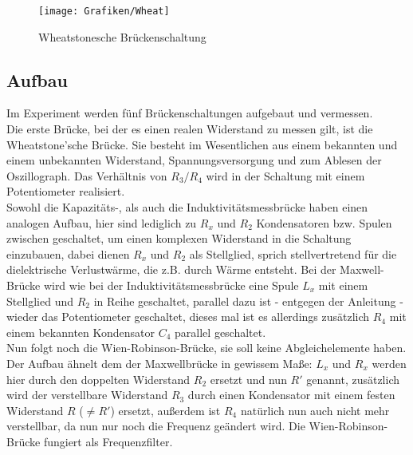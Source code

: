 \begin{wrapfigure}[14]{r}{0.4\textwidth}
       \texttt{[image: Grafiken/Wheat]}
       \caption{Wheatstonesche Brückenschaltung}
       \label{fig:Wheat}
\end{wrapfigure}
\subsection{Aufbau}
Im Experiment werden fünf Brückenschaltungen aufgebaut und vermessen. \\
Die erste Brücke, bei der es einen realen Widerstand zu messen gilt, ist die Wheatstone'sche Brücke. Sie besteht im Wesentlichen aus einem bekannten und einem unbekannten Widerstand, Spannungsversorgung und zum Ablesen der Oszillograph. Das Verhältnis von $R_3/R_4$ wird in der Schaltung mit einem Potentiometer realisiert.\\
Sowohl die Kapazitäts-, als auch die Induktivitätsmessbrücke haben einen analogen Aufbau, hier sind lediglich zu $R_x$ und $R_2$ Kondensatoren bzw. Spulen zwischen geschaltet, um einen komplexen Widerstand in die Schaltung einzubauen, dabei dienen $R_x$ und $R_2$ als Stellglied, sprich stellvertretend für die dielektrische Verlustwärme, die z.B. durch Wärme entsteht.
Bei der Maxwell-Brücke wird wie bei der Induktivitätsmessbrücke eine Spule $L_x$ mit einem Stellglied und $R_2$ in Reihe geschaltet, parallel dazu ist - entgegen der Anleitung - wieder das Potentiometer geschaltet, dieses mal ist es allerdings zusätzlich $R_4$ mit einem bekannten Kondensator $C_4$ parallel geschaltet.\\
Nun folgt noch die Wien-Robinson-Brücke, sie soll keine Abgleichelemente haben.
Der Aufbau ähnelt dem der Maxwellbrücke in gewissem Maße: $L_x$ und $R_x$ werden hier durch den doppelten Widerstand $R_2$ ersetzt und nun $R'$ genannt, zusätzlich wird der verstellbare Widerstand $R_3$ durch einen Kondensator mit einem festen Widerstand $R$ ($\neq R'$) ersetzt, außerdem ist $R_4$ natürlich nun auch nicht mehr verstellbar, da nun nur noch die Frequenz geändert wird.
Die Wien-Robinson-Brücke fungiert als Frequenzfilter. \\

